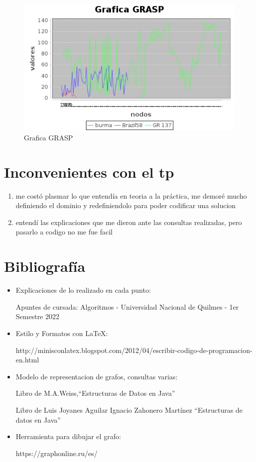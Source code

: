 \documentclass[a4paper,11pt]{article}
\begin{document}
\begin{figure}
	\begin{center}
		\includegraphics{grafico.jpg}
		\caption{Grafica GRASP}
		\label{fig:}
	\end{center}
\end{figure}


\section{Inconvenientes con el tp}
\begin{enumerate}
  \item me costó plasmar lo que entendía en teoria a la práctica, me demoré mucho definiendo el dominio y redefiniendolo para poder codificar una solucion
  \item entendí las explicaciones que me dieron ante las consultas realizadas, pero pasarlo a codigo no me fue facil
\end{enumerate}
\section{Bibliografía}
\begin{itemize}
  \item Explicaciones de lo realizado en cada punto:
  
  Apuntes de cursada: Algoritmos - Universidad Nacional de Quilmes - 1er Semestre 2022
  \item Estilo y Formatos con LaTeX:
  
   http://minisconlatex.blogspot.com/2012/04/escribir-codigo-de-programacion-en.html
   \item Modelo de representacion de grafos, consultas varias:
   
   Libro de M.A.Weiss,“Estructuras de Datos en Java” 
   
   Libro de Luis Joyanes Aguilar
Ignacio Zahonero Martínez  “Estructuras de datos en Java”  
   
   \item Herramienta para dibujar el grafo:
   
   https://graphonline.ru/es/
\end{itemize}
\end{document}
